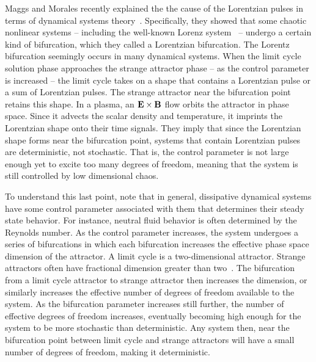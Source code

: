 Maggs and Morales recently explained the the cause of the Lorentzian pulses in terms of dynamical systems theory~\cite{maggs2012a}. 
Specifically, they showed that some chaotic nonlinear systems -- including the well-known
Lorenz system~\cite{lorenz1963} -- undergo a certain kind of bifurcation, which they called a Lorentzian bifurcation. The Lorentz bifurcation seemingly occurs in many dynamical systems.
When the limit cycle solution phase approaches the strange attractor phase -- as the control parameter is increased -- the limit cycle takes on a shape that contains a Lorentzian pulse
or a sum of Lorentzian pulses. The strange attractor near the bifurcation point retains this shape.
In a plasma, an ${\bf E \times B}$ flow orbits the attractor in phase space. Since it advects the scalar density and temperature, it imprints the Lorentzian shape onto their time signals.
They imply that since the Lorentzian shape forms near the bifurcation point, systems that contain Lorentzian pulses are deterministic, not stochastic. That is, the control parameter is not large enough
yet to excite too many degrees of freedom, meaning that the system is still controlled by low dimensional chaos.

To understand this last point, note that in general, dissipative dynamical systems have some control parameter associated with them that determines their steady state behavior. For instance, 
neutral fluid behavior is often determined by the Reynolds number. As the control parameter increases, the system undergoes a series of bifurcations in which each bifurcation increases the effective
phase space dimension of the attractor. A limit cycle is a two-dimensional attractor. Strange attractors often have fractional dimension greater than two~\cite{manneville2004}.
The bifurcation from a limit cycle attractor to strange attractor then increases the dimension, or similarly increases the effective number of degrees of freedom available to the system.
As the bifurcation parameter increases still further, the number of effective degrees of freedom increases, eventually becoming high enough for the system to be more stochastic than deterministic.
Any system then, near the bifurcation point between limit cycle and strange attractors will have a small number of degrees of freedom, making it deterministic.

